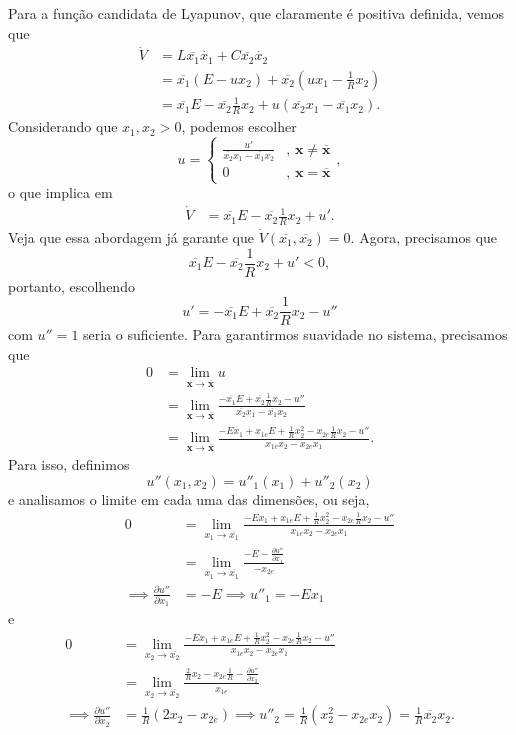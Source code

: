 \documentclass[a4paper]{report}
\begin{document}
Para a função candidata de  Lyapunov, que claramente é positiva definida, vemos que 
\begin{align*}
    \dot{V} &= L \overline{x_1}\dot{x_1} + C \overline{x_2} \dot{x_2} \\
	    &= \overline{x_1}\left( E - ux_2 \right) + \overline{x_2} \left( ux_1 - \frac{1}{R}x_2 \right) \\
	    &= \overline{x_1}E -\overline{x_2}\frac{1}{R}x_2 + u\left( \overline{x_2}x_1 -\overline{x_1}x_2 \right) 
.\end{align*}
Considerando que $x_1,x_2 > 0$, podemos escolher \[
u = \begin{cases}
    \frac{u'}{\overline{x_2}x_1 -\overline{x_1}x_2} &\text{, }\bm{x} \neq \bm{\overline{x}} \\
    0 &\text{, }\bm{x} = \bm{\overline{x}}
\end{cases}
,\] o que implica em
\begin{align*}
    \dot{V} &= \overline{x_1}E -\overline{x_2}\frac{1}{R}x_2 + u'
.\end{align*}
Veja que essa abordagem já garante que $\dot{V}(\overline{x_1}, \overline{x_2}) = 0$. Agora, precisamos que \[
\overline{x_1}E -\overline{x_2}\frac{1}{R}x_2 + u' < 0
,\] portanto, escolhendo \[
u' = -\overline{x_1}E +\overline{x_2}\frac{1}{R}x_2 -u''
\] com $u'' = 1$ seria o suficiente. Para garantirmos suavidade no sistema, precisamos que
\begin{align*}
    0 &= \lim_{\bm{x} \to \overline{\bm{x}}} u \\
      &= \lim_{\bm{x} \to \overline{\bm{x}}} \frac{-\overline{x_1}E +\overline{x_2}\frac{1}{R}x_2 -u''}{\overline{x_2}x_1 -\overline{x_1}x_2} \\
      &= \lim_{\bm{x} \to \overline{\bm{x}}} \frac{-Ex_1 + x_{1e}E + \frac{1}{R}x_2^2 - x_{2e}\frac{1}{R}x_2 -u''}{x_{1e}x_2 - x_{2e}x_1}
.\end{align*}
Para isso, definimos \[
    u''(x_1,x_2) = u''_1(x_1) + u''_2(x_2)
\] e analisamos o limite em cada uma das dimensões, ou seja, 
\begin{align*}
     0 &= \lim_{x_1 \to \overline{x_1}} \frac{-Ex_1 + x_{1e}E + \frac{1}{R}x_2^2 - x_{2e}\frac{1}{R}x_2 -u''}{x_{1e}x_2 - x_{2e}x_1} \\
    &= \lim_{x_1 \to \overline{x_1}} \frac{-E - \frac{\partial u''}{\partial x_1} }{ -x_{2e} } \\
     \implies \frac{\partial u''}{\partial x_1} &= -E \implies u''_1 = -Ex_1
\end{align*}
e
\begin{align*}
     0 &= \lim_{x_2 \to \overline{x_2}} \frac{-Ex_1 + x_{1e}E + \frac{1}{R}x_2^2 - x_{2e}\frac{1}{R}x_2 -u''}{x_{1e}x_2 - x_{2e}x_1} \\
&= \lim_{x_2 \to \overline{x_2}} \frac{\frac{2}{R}x_2 -x_{2e}\frac{1}{R} - \frac{\partial u''}{\partial x_2} }{x_{1e}} \\
     \implies \frac{\partial u''}{\partial x_2} &= \frac{1}{R}\left( 2x_2 -x_{2e} \right) \implies u''_2 = \frac{1}{R}\left( x_2^2 -x_{2e}x_2 \right) = \frac{1}{R}\overline{x_2}x_2
.\end{align*}
\end{document}
